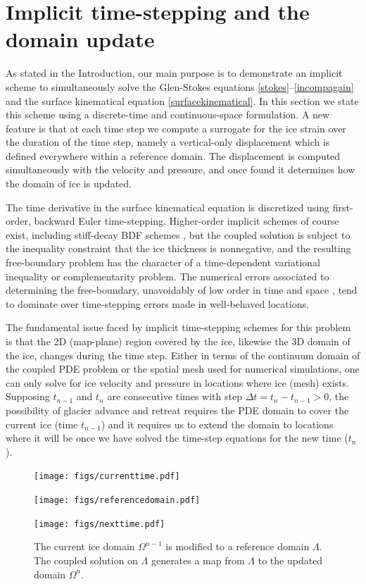\documentclass[letterpaper,final,12pt,reqno]{amsart}
\begin{document}
\section{Implicit time-stepping and the domain update} \label{sec:implicitstep}

As stated in the Introduction, our main purpose is to demonstrate an implicit scheme to simultaneously solve the Glen-Stokes equations \eqref{stokes}--\eqref{incompagain} and the surface kinematical equation \eqref{surfacekinematical}.  In this section we state this scheme using a discrete-time and continuous-space formulation.  A new feature is that at each time step we compute a surrogate for the ice strain over the duration of the time step, namely a vertical-only displacement which is defined everywhere within a reference domain.  The displacement is computed simultaneously with the velocity and pressure, and once found it determines how the domain of ice is updated.

The time derivative in the surface kinematical equation is discretized using first-order, backward Euler time-stepping.  Higher-order implicit schemes of course exist, including stiff-decay BDF schemes \cite{AscherPetzold1998,Bueler2021}, but the coupled solution is subject to the inequality constraint that the ice thickness is nonnegative, and the resulting free-boundary problem has the character of a time-dependent variational inequality \cite{Calvoetal2002} or complementarity \cite{Bueler2016,Bueler2021} problem.  The numerical errors associated to determining the free-boundary, unavoidably of low order in time and space \cite{Bueler2020}, tend to dominate over time-stepping errors made in well-behaved locations.

The fundamental issue faced by implicit time-stepping schemes for this problem is that the 2D (map-plane) region covered by the ice, likewise the 3D domain of the ice, changes during the time step.  Either in terms of the continuum domain of the coupled PDE problem or the spatial mesh used for numerical simulations, one can only solve for ice velocity and pressure in locations where ice (mesh) exists.  Supposing $t_{n-1}$ and $t_n$ are consecutive times with step $\Delta t = t_n - t_{n-1} > 0$, the possibility of glacier advance and retreat requires the PDE domain to cover the current ice (time $t_{n-1}$) and it requires us to extend the domain to locations where it will be once we have solved the time-step equations for the new time ($t_n$).

\begin{figure}[ht]
\begin{center}
\texttt{[image: figs/currenttime.pdf]}
\vspace{-6mm}

\texttt{[image: figs/referencedomain.pdf]}
\vspace{-1mm}

\texttt{[image: figs/nexttime.pdf]}
\end{center}
\caption{The current ice domain $\Omega^{n-1}$ is modified to a reference domain $\Lambda$.  The coupled solution on $\Lambda$ generates a map from $\Lambda$ to the updated domain $\Omega^n$.}
\label{fig:domainupdate}
\end{figure}
\end{document}
